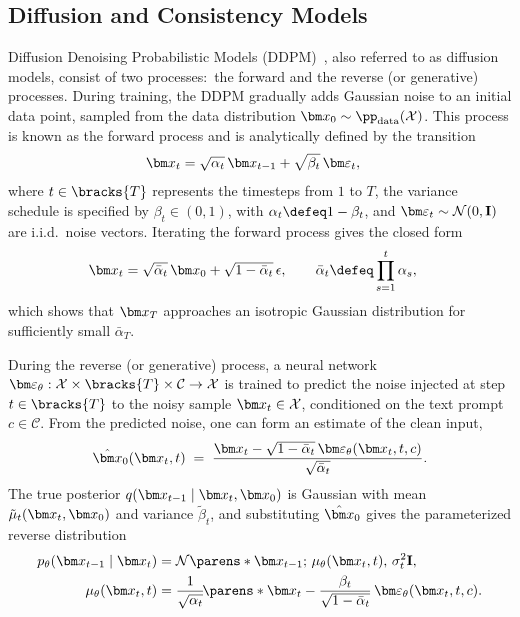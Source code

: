 \subsection{Diffusion and Consistency Models}
Diffusion Denoising Probabilistic Models (DDPM)~\cite{ho2020denoising}, also referred to as diffusion models, consist of two processes:~the forward and the reverse (or generative) processes. During training, the DDPM gradually adds Gaussian noise to an initial data point, sampled from the data distribution $\x_0\sim \pp_\text{data}(\mathcal{X})$. This process is known as the forward process and is analytically defined by the transition
\begin{align}\label{eq:forward}
    \x_t &= \sqrt{\alpha_t}\,\x_{t-1} + \sqrt{\beta_t}\,\eps_t,
\end{align}
where $t \in \bracks{T}$ represents the timesteps from $1$ to $T$, the variance schedule is specified by $\beta_t\in(0,1)$, with $\alpha_t\defeq 1-\beta_t$, and $\eps_t\sim \mathcal{N}(0,\mathbf I)$ are i.i.d.\ noise vectors. Iterating the forward process gives the closed form
\begin{align}
    \x_t &= \sqrt{\bar\alpha_t}\,\x_0 + \sqrt{1-\bar\alpha_t}\,\epsilon, \qquad 
    \bar\alpha_t \defeq \prod_{s=1}^t \alpha_s,
\end{align}
which shows that $\x_T$ approaches an isotropic Gaussian distribution for sufficiently small $\bar\alpha_T$.  

During the reverse (or generative) process, a neural network ${ \eps_\theta: \mathcal{X}\times\bracks{T}\times\mathcal{C}\to\mathcal{X} }$ is trained to predict the noise injected at step $t\in\bracks{T}$ to the noisy sample $\x_t\in\mathcal{X}$, conditioned on the text prompt $c\in\mathcal{C}$. From the predicted noise, one can form an estimate of the clean input,
\begin{align}\label{eq:x0hat}
    \hat \x_0(\x_t,t) \;=\; \frac{\x_t - \sqrt{1-\bar\alpha_t}\,\eps_\theta(\x_t,t,c)}{\sqrt{\bar\alpha_t}}.
\end{align}
The true posterior $q(\x_{t-1}\mid \x_t,\x_0)$ is Gaussian with mean $\tilde\mu_t(\x_t,\x_0)$ and variance $\tilde\beta_t$, and substituting $\hat \x_0$ gives the parameterized reverse distribution
\begin{align}
    p_\theta(\x_{t-1}\mid \x_t) &= \mathcal{N}\parens*{\x_{t-1};\,\mu_\theta(\x_t,t),\,\sigma_t^2\mathbf I},\\
    \mu_\theta(\x_t,t) &= \frac{1}{\sqrt{\alpha_t}}\!\parens*{\x_t - \frac{\beta_t}{\sqrt{1-\bar\alpha_t}}\,\eps_\theta(\x_t,t,c)}.
\end{align}

